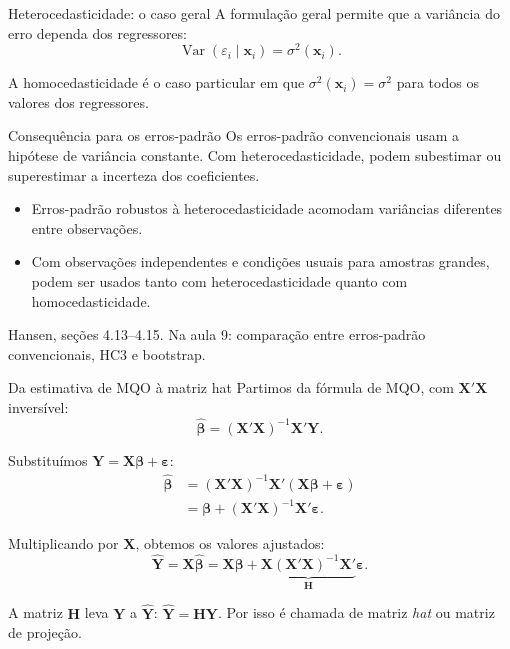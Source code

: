 \documentclass[
  ignorenonframetext,
  brazilian,
  aspectratio=169,
  10pt]{beamer}
\providecommand{\tightlist}{%
  \setlength{\itemsep}{0pt}\setlength{\parskip}{0pt}}
\begin{document}
\begin{frame}{Heterocedasticidade: o caso geral}
\protect{}\label{heterocedasticidade-o-caso-geral}
A formulação geral permite que a variância do erro dependa dos
regressores: \[
\operatorname{Var}(\varepsilon_i\mid\mathbf x_i)=\sigma^2(\mathbf x_i).
\]

A homocedasticidade é o caso particular em que
\(\sigma^2(\mathbf x_i)=\sigma^2\) para todos os valores dos
regressores.

\begin{block}{Consequência para os erros-padrão}
Os erros-padrão convencionais usam a hipótese de variância constante.
Com heterocedasticidade, podem subestimar ou superestimar a incerteza dos coeficientes.
\end{block}

\begin{itemize}
\tightlist
\item
  Erros-padrão robustos à heterocedasticidade acomodam variâncias
  diferentes entre observações.
\item
  Com observações independentes e condições usuais para amostras
  grandes, podem ser usados tanto com heterocedasticidade quanto com
  homocedasticidade.
\end{itemize}

\scriptsize Hansen, seções 4.13--4.15. Na aula 9: comparação entre
erros-padrão convencionais, HC3 e bootstrap.
\end{frame}

\begin{frame}{Da estimativa de MQO à matriz hat}
\protect{}\label{da-estimativa-de-mqo-uxe0-matriz-hat}
Partimos da fórmula de MQO, com \(\mathbf X'\mathbf X\) inversível: \[
\widehat{\boldsymbol\beta}=(\mathbf X'\mathbf X)^{-1}\mathbf X'\mathbf Y.
\]

Substituímos
\(\mathbf Y=\mathbf X\boldsymbol\beta+\boldsymbol\varepsilon\): \[
\begin{aligned}
\widehat{\boldsymbol\beta}
&=(\mathbf X'\mathbf X)^{-1}\mathbf X'(\mathbf X\boldsymbol\beta+\boldsymbol\varepsilon)\\
&=\boldsymbol\beta+(\mathbf X'\mathbf X)^{-1}\mathbf X'\boldsymbol\varepsilon.
\end{aligned}
\]

Multiplicando por \(\mathbf X\), obtemos os valores ajustados: \[
\widehat{\mathbf Y}=\mathbf X\widehat{\boldsymbol\beta}
=\mathbf X\boldsymbol\beta+
\underbrace{\mathbf X(\mathbf X'\mathbf X)^{-1}\mathbf X'}_{\mathbf H}
\boldsymbol\varepsilon.
\]

A matriz \(\mathbf H\) leva \(\mathbf Y\) a \(\widehat{\mathbf Y}\):
\(\widehat{\mathbf Y}=\mathbf H\mathbf Y\). Por isso é chamada de matriz
\textit{hat} ou matriz de projeção.
\end{frame}
\end{document}
